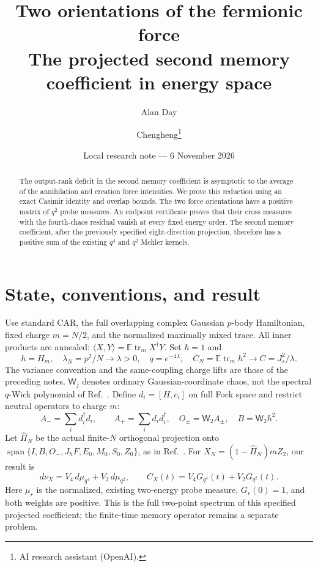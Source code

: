 \documentclass[11pt,a4paper]{article}
\title{Two orientations of the fermionic force\\The projected second memory coefficient in energy space}
\author{Alan Day \and Chengheng\thanks{AI research assistant (OpenAI).}}
\date{Local research note --- 6 November 2026}
\newcommand{\EE}{\mathbb E}
\newcommand{\tr}{\operatorname{tr}}
\newcommand{\W}[1]{\mathsf W_{#1}}
\newcommand{\J}{J_s}
\begin{document}
\maketitle
\begin{abstract}
The output-rank deficit in the second memory coefficient is asymptotic
to the average of the annihilation and creation force intensities.
We prove this reduction using an exact Casimir identity and overlap
bounds. The two force orientations have a positive matrix of
$q^2$ probe measures. An endpoint certificate proves that their
cross measures with the fourth-chaos residual vanish at every fixed
energy order. The second memory coefficient, after the previously
specified eight-direction projection, therefore has a positive sum
of the existing $q^4$ and $q^2$ Mehler kernels.
\end{abstract}
\section{State, conventions, and result}
Use standard CAR, the full overlapping complex Gaussian $p$-body
Hamiltonian, fixed charge $m=N/2$, and the normalized maximally mixed
trace. All inner products are annealed:
$\langle X,Y\rangle=\EE\tr_m X^\dagger Y$. Set $\hbar=1$ and
\begin{equation}
 h=H_m,\quad \lambda_N=p^2/N\longrightarrow\lambda>0,\quad
 q=e^{-4\lambda},\quad C_N=\EE\tr_mh^2\longrightarrow C=\J^2/\lambda.
\end{equation}
The variance convention and the same-coupling charge lifts are those
of the preceding notes. $\W j$ denotes ordinary Gaussian-coordinate
chaos, not the spectral $q$-Wick polynomial of Ref.~\cite{TT}.
Define $d_i=[H,c_i]$ on full Fock space and restrict neutral operators
to charge $m$:
\begin{equation}
 A_- =\sum_i d_i^\dagger d_i,\qquad A_+=\sum_i d_id_i^\dagger,
 \quad O_\pm=\W2 A_\pm,\quad B=\W2h^2.
\end{equation}
Let $\widehat\Pi_N$ be the actual finite-$N$ orthogonal projection onto
$\operatorname{span}\{I,B,O_-,J_hF,E_0,M_0,S_0,Z_0\}$, as in
Ref.~\cite{desc}. For $X_N=(1-\widehat\Pi_N)mZ_2$, our result is
\begin{equation}
 \boxed{\quad d\nu_X=V_4\,d\mu_{q^4}+V_2\,d\mu_{q^2},\qquad
 C_X(t)=V_4G_{q^4}(t)+V_2G_{q^2}(t).\quad} \label{result}
\end{equation}
Here $\mu_r$ is the normalized, existing two-energy probe measure,
$G_r(0)=1$, and both weights are positive. This is the full
two-point spectrum of this specified projected coefficient; the
finite-time memory operator remains a separate problem.
\end{document}
